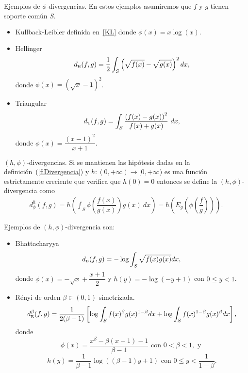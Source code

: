 \begin{example} Ejemplos de $\phi$-divergencias. En estos ejemplos asumiremos que $f$ y $g$ tienen soporte común $S$.
	\begin{itemize}
		\item Kullback-Leibler definida en~\eqref{KL} donde $\phi(x)=x \log(x)$.
		\item Hellinger
		\begin{align} 
		d_{\text{\tiny{H}}}(f,g)=\dfrac{1}{2} \displaystyle \int_{S} \left(\sqrt{f(x)}-\sqrt{g(x)}\right)^2 dx,
		\end{align}
		donde $\phi(x)=\left(\sqrt{x}-1\right)^2$.
		\item Triangular
		\begin{align}
		\label{triangular}
		d_{\text{\tiny{T}}}(f,g)=\displaystyle \int_{S} \dfrac{\left(f(x)-g(x)\right)^2}{f(x)+g(x)} \ dx,
		\end{align}
		donde $\phi(x)=\dfrac{\left(x-1 \right)^2}{x+1}$.
	\end{itemize}
\end{example}

\begin{definition} $(h,\phi)$-divergencias.
	\label{hfiDivergencia}
	Si se mantienen las hipótesis dadas en la definición~(\ref{fiDivergencia}) y $h: (0,+\infty)\rightarrow [0,+\infty)$ es una función estrictamente creciente que verifica que $h(0)=0$ entonces se define la $(h,\phi)$-divergencia como
	\begin{align}
	d^h_{\phi}(f, g)=h\left(\int_{S} \phi\left(\dfrac{f(x)}{g(x)}\right) g(x) \ dx\right)=h\left(E_{g}\left(\phi\left(\dfrac{f}{g}\right)\right)\right).
	\end{align}
\end{definition}

\begin{example} Ejemplos de $(h,\phi)$-divergencia son:
	\begin{itemize}
		\item Bhattacharyya 
		\begin{align}
		\label{Bhattacharyya}
		d_{\text{\tiny{B}}}(f,g)=-\log \displaystyle \int_{S} \sqrt{f(x) g(x)} dx,
		\end{align}
		donde $\phi(x)=-\sqrt{x}+\dfrac{x+1}{2}$ y $h(y)=-\log(-y+1)$ con $0\leq y<1$.
		\item R\'enyi de orden $\beta\in(0,1)$ simetrizada.
		\begin{align}
		d_\text{\tiny{R}}^{\beta}(f,g)=\frac{1}{2(\beta-1)}\left[\log\int_{S}{f(x)^{\beta}g(x)^{1-\beta} dx+\log\int_{S}f(x)^{1-\beta}g(x)^{\beta}} dx\right],
		\end{align}
		donde 
		$$\phi(x)=\dfrac{x^{\beta}-\beta(x-1)-1}{\beta-1} \text{ con } 0 < \beta < 1, \text{ y }$$  
		$$h(y)=\dfrac{1}{\beta-1}\log((\beta-1)y+1) \text{ con } 0\leq y<\dfrac{1}{1-\beta}.$$
	\end{itemize}
\end{example}

